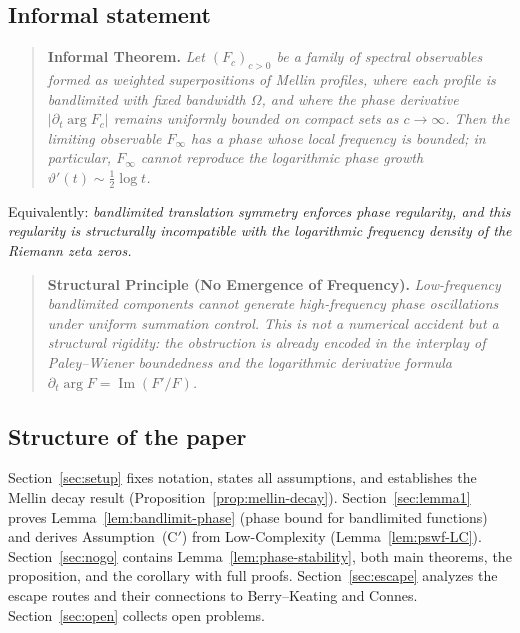 \documentclass[12pt,a4paper]{amsart}
\theoremstyle{definition}
\begin{document}
\subsection*{Informal statement}

\begin{quote}
\textbf{Informal Theorem.}
\textit{Let $(F_c)_{c>0}$ be a family of spectral
observables formed as weighted superpositions of Mellin
profiles, where each profile is bandlimited with fixed
bandwidth $\Omega$, and where the phase derivative
$|\partial_t \arg F_c|$ remains uniformly bounded on
compact sets as $c \to \infty$. Then the limiting
observable $F_\infty$ has a phase whose local frequency
is bounded; in particular, $F_\infty$ cannot reproduce
the logarithmic phase growth
$\vartheta'(t) \sim \tfrac{1}{2}\log t$.}
\end{quote}

\noindent
Equivalently: \emph{bandlimited translation symmetry
enforces phase regularity, and this regularity is
structurally incompatible with the logarithmic frequency
density of the Riemann zeta zeros.}

\begin{quote}
\textbf{Structural Principle (No Emergence of Frequency).}
\textit{Low-frequency bandlimited components cannot generate
high-frequency phase oscillations under uniform summation
control. This is not a numerical accident but a structural
rigidity: the obstruction is already encoded in the interplay
of Paley--Wiener boundedness and the logarithmic derivative
formula $\partial_t \arg F = \operatorname{Im}(F'/F)$.}
\end{quote}

\subsection*{Structure of the paper}

Section~\ref{sec:setup} fixes notation, states all
assumptions, and establishes the Mellin decay result
(Proposition~\ref{prop:mellin-decay}).
Section~\ref{sec:lemma1} proves
Lemma~\ref{lem:bandlimit-phase} (phase bound for
bandlimited functions) and derives Assumption~(C$'$)
from Low-Complexity (Lemma~\ref{lem:pswf-LC}).
Section~\ref{sec:nogo} contains
Lemma~\ref{lem:phase-stability}, both main theorems,
the proposition, and the corollary with full proofs.
Section~\ref{sec:escape} analyzes the escape routes
and their connections to Berry--Keating and Connes.
Section~\ref{sec:open} collects open problems.
\end{document}
